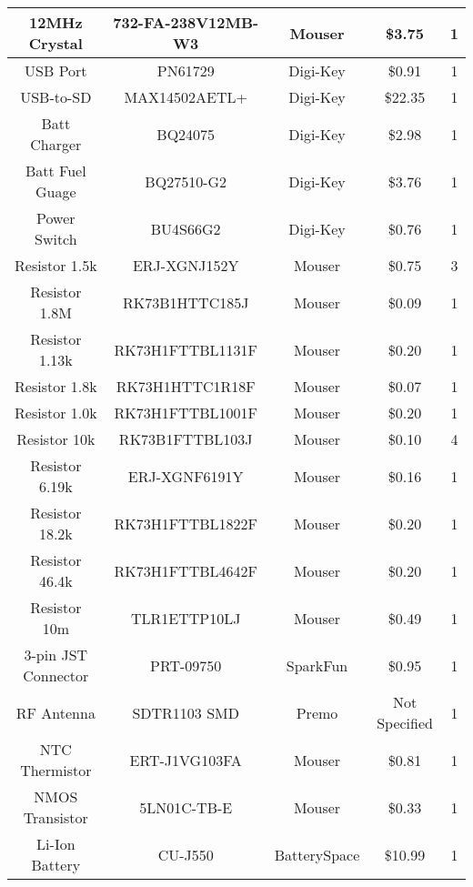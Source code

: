 \begin{center}
\begin{longtable}{|c|c|c|c|c|}
    12MHz Crystal & 732-FA-238V12MB-W3 & Mouser & \$3.75  & 1 \\ \hline
    USB Port & PN61729 & Digi-Key & \$0.91  & 1 \\ \hline
    USB-to-SD & MAX14502AETL+ & Digi-Key & \$22.35  & 1 \\ \hline
    Batt Charger & BQ24075  & Digi-Key & \$2.98  & 1 \\ \hline
    Batt Fuel Guage & BQ27510-G2 & Digi-Key & \$3.76  & 1 \\ \hline
    Power Switch & BU4S66G2 & Digi-Key & \$0.76  & 1 \\ \hline
    Resistor 1.5k & ERJ-XGNJ152Y & Mouser & \$0.75  & 3 \\ \hline
    Resistor 1.8M & RK73B1HTTC185J & Mouser & \$0.09  & 1 \\ \hline
    Resistor 1.13k & RK73H1FTTBL1131F & Mouser & \$0.20  & 1 \\ \hline
    Resistor 1.8k & RK73H1HTTC1R18F & Mouser & \$0.07  & 1 \\ \hline
    Resistor 1.0k & RK73H1FTTBL1001F & Mouser & \$0.20  & 1 \\ \hline
    Resistor 10k & RK73B1FTTBL103J & Mouser & \$0.10  & 4 \\ \hline
    Resistor 6.19k & ERJ-XGNF6191Y & Mouser & \$0.16  & 1 \\ \hline
    Resistor 18.2k & RK73H1FTTBL1822F & Mouser & \$0.20  & 1 \\ \hline
    Resistor 46.4k & RK73H1FTTBL4642F & Mouser & \$0.20  & 1 \\ \hline
    Resistor 10m & TLR1ETTP10LJ & Mouser & \$0.49  & 1 \\ \hline
    3-pin JST Connector & PRT-09750 & SparkFun & \$0.95  & 1 \\ \hline
    RF Antenna & SDTR1103 SMD & Premo & Not Specified & 1 \\ \hline
    NTC Thermistor	& ERT-J1VG103FA	& Mouser	&\$0.81&	1 \\ \hline
	NMOS Transistor	&5LN01C-TB-E	&Mouser	&\$0.33		&1 \\ \hline
	Li-Ion Battery & CU-J550 & BatterySpace & \$10.99 & 1 \\ \hline

        \end{longtable}
\end{center}


